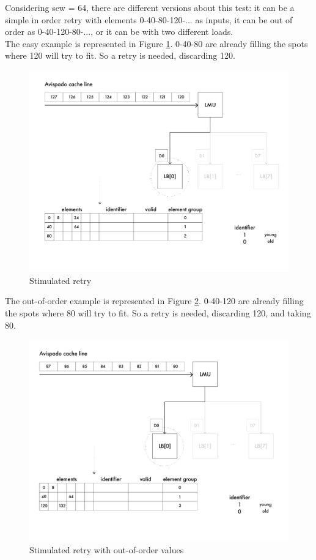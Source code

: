 Considering sew = 64, there are different versions about this test: it can be a simple in order retry with elements 0-40-80-120-... as inputs, it can be out of order as 0-40-120-80-..., or it can be with two different loads.\\

The easy example is represented in Figure \ref{cache-to-lb-ret-ex}. 0-40-80 are already filling the spots where 120 will try to fit. So a retry is needed, discarding 120.

\begin{figure}[H]
    \centering
    \includegraphics[scale = 0.5]{Chapter_2/img/cache-to-lb-ret-ex.png}
    \caption{Stimulated retry}
    \label{cache-to-lb-ret-ex}
\end{figure}


The out-of-order example is represented in Figure \ref{cache-to-lb-ooo-ret-ex}. 0-40-120 are already filling the spots where 80 will try to fit. So a retry is needed, discarding 120, and taking 80.

\begin{figure}[H]
    \centering
    \includegraphics[scale = 0.5]{Chapter_2/img/cache-to-lb-ooo-ret-ex.png}
    \caption{Stimulated retry with out-of-order values}
    \label{cache-to-lb-ooo-ret-ex}
\end{figure}



